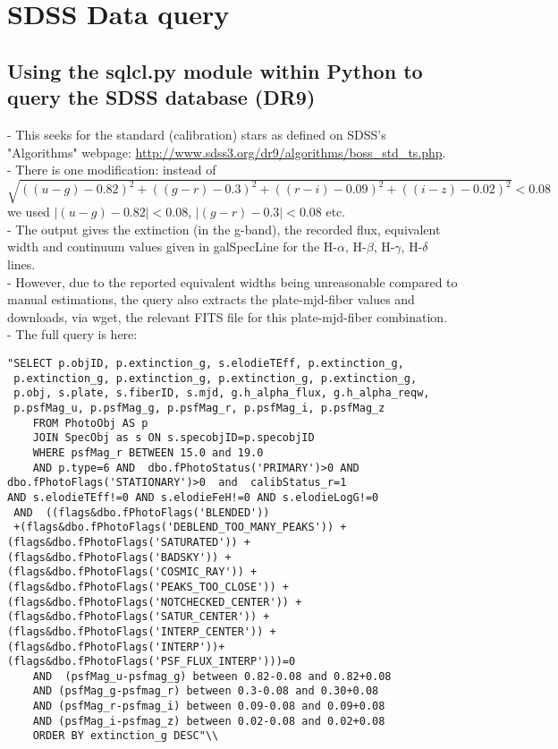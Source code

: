 \documentclass[12pt]{article}
\begin{document}
\section{SDSS Data query}
\subsection{ Using the sqlcl.py module within Python to query the SDSS database (DR9)}
- This seeks for the standard (calibration) stars as defined on SDSS's "Algorithms" webpage: \url{http://www.sdss3.org/dr9/algorithms/boss_std_ts.php}. \\
- There is one modification: instead of \\ $\sqrt{((u-g)-0.82)^2+((g-r)-0.3)^2+((r-i)-0.09)^2+((i-z)-0.02)^2}<0.08$ we used $|(u-g)-0.82|<0.08$, $|(g-r)-0.3|<0.08$ etc. \\
- The output gives the extinction (in the g-band), the recorded flux, equivalent width and continuum values given in galSpecLine for the H-$\alpha$, H-$\beta$, H-$\gamma$, H-$\delta$ lines. \\
- However, due to the reported equivalent widths being unreasonable compared to manual estimations, the query also extracts the plate-mjd-fiber values and downloads, via wget, the relevant FITS file for this plate-mjd-fiber combination. \\
- The full query is here: 
\begin{verbatim}"SELECT p.objID, p.extinction_g, s.elodieTEff, p.extinction_g,
 p.extinction_g, p.extinction_g, p.extinction_g, p.extinction_g,
 p.obj, s.plate, s.fiberID, s.mjd, g.h_alpha_flux, g.h_alpha_reqw, 
 p.psfMag_u, p.psfMag_g, p.psfMag_r, p.psfMag_i, p.psfMag_z 
    FROM PhotoObj AS p 
    JOIN SpecObj as s ON s.specobjID=p.specobjID 
    WHERE psfMag_r BETWEEN 15.0 and 19.0 
    AND p.type=6 AND  dbo.fPhotoStatus('PRIMARY')>0 AND 
dbo.fPhotoFlags('STATIONARY')>0  and  calibStatus_r=1 
AND s.elodieTEff!=0 AND s.elodieFeH!=0 AND s.elodieLogG!=0 
 AND  ((flags&dbo.fPhotoFlags('BLENDED')) 
 +(flags&dbo.fPhotoFlags('DEBLEND_TOO_MANY_PEAKS')) +   
(flags&dbo.fPhotoFlags('SATURATED')) +
(flags&dbo.fPhotoFlags('BADSKY')) + 
(flags&dbo.fPhotoFlags('COSMIC_RAY')) +
(flags&dbo.fPhotoFlags('PEAKS_TOO_CLOSE')) +   
(flags&dbo.fPhotoFlags('NOTCHECKED_CENTER')) +
(flags&dbo.fPhotoFlags('SATUR_CENTER')) +  
(flags&dbo.fPhotoFlags('INTERP_CENTER')) +
(flags&dbo.fPhotoFlags('INTERP'))+  
(flags&dbo.fPhotoFlags('PSF_FLUX_INTERP')))=0 
    AND  (psfMag_u-psfmag_g) between 0.82-0.08 and 0.82+0.08 
    AND (psfMag_g-psfmag_r) between 0.3-0.08 and 0.30+0.08 
    AND (psfMag_r-psfmag_i) between 0.09-0.08 and 0.09+0.08 
    AND (psfMag_i-psfmag_z) between 0.02-0.08 and 0.02+0.08 
    ORDER BY extinction_g DESC"\\
\end{verbatim}
\end{document}
